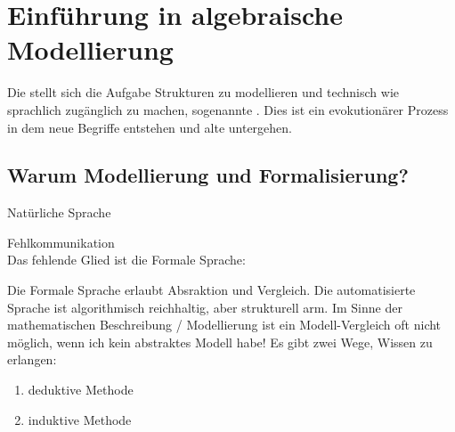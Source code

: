
\section{Einführung in algebraische Modellierung}


Die  stellt sich die Aufgabe Strukturen zu modellieren und technisch wie sprachlich zugänglich zu machen, sogenannte .
Dies ist ein evokutionärer Prozess in dem neue Begriffe entstehen und alte untergehen.

\subsection{Warum Modellierung und Formalisierung?}
Natürliche Sprache

\begin{figure}[H] %
	\begin{center}
		
	\end{center}
\end{figure}

 Fehlkommunikation\\
Das fehlende Glied ist die Formale Sprache:

\begin{figure}[H] %
	\begin{center}
		
	\end{center}
\end{figure}

Die Formale Sprache erlaubt Absraktion und Vergleich.
Die automatisierte Sprache ist algorithmisch reichhaltig, aber strukturell arm.
Im Sinne der mathematischen Beschreibung / Modellierung ist ein Modell-Vergleich oft nicht möglich, wenn ich kein abstraktes Modell habe!\nl
Es gibt zwei Wege, Wissen zu erlangen:
\begin{enumerate}
	\item {} deduktive Methode
	\item {} induktive Methode
\end{enumerate}

